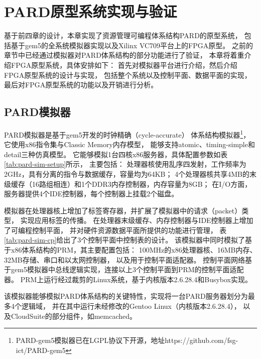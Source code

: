 

\chapter{PARD原型系统实现与验证}
\label{chap:impl}

基于前四章的设计，本章实现了资源管理可编程体系结构PARD的原型系统，
包括基于gem5的全系统模拟器实现以及Xilinx VC709平台上的FPGA原型。
之前的章节中已经通过模拟器对PARD体系结构的部分功能进行了验证，
本章将着重介绍FPGA原型系统，具体安排如下：
首先对模拟器平台进行介绍，然后介绍FPGA原型系统的设计与实现，
包括整个系统以及控制平面、数据平面的实现，
最后对FPGA原型系统的功能以及开销进行分析。

\section{PARD模拟器}
\label{chap:impl:simulator}

PARD模拟器是基于gem5\cite{binkert_gem5_2011}开发的时钟精确（cycle-accurate）
体系结构模拟器\footnote{PARD-gem5模拟器已在LGPL协议下开源，地址https://github.com/fsg-ict/PARD-gem5}，
它使用x86指令集与Classic Memory内存模型，
能够支持atomic、timing-simple和detail三种仿真模型。
它能够模拟1台四核x86服务器，具体配置参数如表\ref{tab:pard-sim-setup}所示，
主要包括：
处理器核使用乱序四发射，工作频率为2GHz，具有分离的指令与数据缓存，容量均为64KB；
4个处理器核共享4MB的末级缓存（16路组相连）和1个DDR3内存控制器，内存容量为8GB；
在I/O方面，服务器提供4个IDE控制器，每个控制器上挂载2个磁盘。

模拟器在处理器核上增加了标签寄存器，并扩展了模拟器中的请求（packet）类型，
实现应用标签的传播。
在处理器末级缓存、内存控制器与IDE控制器上增加了可编程控制平面，
并对硬件资源数据平面所提供的功能进行管理，
表\ref{tab:pard-sim-cp}给出了3个控制平面中控制表的设计。
该模拟器中同时模拟了基于x86体系结构的PRM，其主要配置包括：
100MHz的x86处理器核、16MB内存、32MB存储、串口和以太网控制器，
以及用于控制平面适配器。
控制平面网络基于gem5模拟器中总线逻辑实现，连接以上3个控制平面到PRM的控制平面适配器。
PRM上运行经过裁剪的Linux系统，基于内核版本2.6.28.4和Busybox\cite{busybox}实现。

该模拟器能够模拟PARD体系结构的关键特性，实现将一台PARD服务器划分为最多4个逻辑域，
并在其中运行未经修改的Gentoo Linux（内核版本2.6.28.4），
以及CloudSuite\cite{Ferdman:2012:cloudsuite}的部分组件，如memcached\cite{memcached}。

